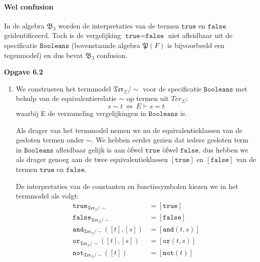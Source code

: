 \documentclass[a4paper,11pt]{article}
\begin{document}
\begin{enumerate}
\paragraph{Wel confusion}

In de algebra $\mathfrak{B}_{3}$ worden de interpretaties van de termen
$\texttt{true}$ en $\texttt{false}$ ge\"identificeerd. Toch is de vergelijking
$\texttt{true} = \texttt{false}$ niet afleidbaar uit de specificatie
$\texttt{Booleans}$ (bovenstaande algebra $\mathfrak{P}(F)$ is bijvoorbeeld
een tegenmodel) en dus bevat $\mathfrak{B}_{3}$ confusion.\\[2em]

\end{enumerate}


{\bf Opgave 6.2}

\begin{enumerate}

\item %

We construeren het termmodel $\mathfrak{Ter}_{\Sigma}/\sim$ voor de
specificatie $\texttt{Booleans}$ met behulp van de equivalentierelatie $\sim$
op termen uit $Ter_{\Sigma}$:
\begin{displaymath}
s \sim t \, \Longleftrightarrow \, E \vdash s = t
\end{displaymath}
waarbij E de verzameling vergelijkingen in $\texttt{Booleans}$ is.

Als drager van het termmodel nemen we nu de equivalentieklassen van de
gesloten termen onder $\sim$. We hebben eerder gezien dat iedere gesloten term
in $\texttt{Booleans}$ afleidbaar gelijk is aan \`ofwel $\texttt{true}$
\`ofwel $\texttt{false}$, dus hebben we als drager genoeg aan de twee
equivalentieklassen $[\texttt{true}]$ en $[\texttt{false}]$ van de termen
$\texttt{true}$ en $\texttt{false}$.

De interpretaties van de constanten en functiesymbolen kiezen we in het
termmodel als volgt:
\begin{align*}
\texttt{true}_{\mathfrak{Ter}_{\Sigma}/\sim}         &= [\texttt{true}] \\
\texttt{false}_{\mathfrak{Ter}_{\Sigma}/\sim}        &= [\texttt{false}] \\
\texttt{and}_{\mathfrak{Ter}_{\Sigma}/\sim}([t],[s]) &= [\texttt{and}(t,s)] \\
\texttt{or}_{\mathfrak{Ter}_{\Sigma}/\sim}([t],[s])  &= [\texttt{or}(t,s)] \\
\texttt{not}_{\mathfrak{Ter}_{\Sigma}/\sim}([t])     &= [\texttt{not}(t)] \\
\end{align*}


\end{enumerate}
\end{document}
